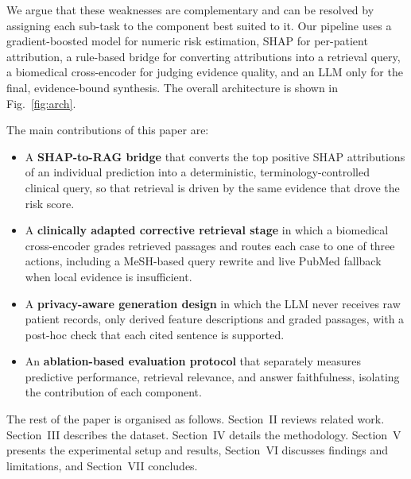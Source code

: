 \documentclass[conference]{IEEEtran}
\begin{document}
We argue that these weaknesses are complementary and can be resolved by
assigning each sub-task to the component best suited to it. Our pipeline
uses a gradient-boosted model for numeric risk estimation, SHAP for
per-patient attribution, a rule-based bridge for converting attributions
into a retrieval query, a biomedical cross-encoder for judging evidence
quality, and an LLM only for the final, evidence-bound synthesis. The
overall architecture is shown in Fig.~\ref{fig:arch}.

The main contributions of this paper are:
\begin{itemize}
\item A \textbf{SHAP-to-RAG bridge} that converts the top positive SHAP
attributions of an individual prediction into a deterministic,
terminology-controlled clinical query, so that retrieval is driven by the
same evidence that drove the risk score.
\item A \textbf{clinically adapted corrective retrieval stage} in which a
biomedical cross-encoder grades retrieved passages and routes each case to
one of three actions, including a MeSH-based query rewrite and live PubMed
fallback when local evidence is insufficient.
\item A \textbf{privacy-aware generation design} in which the LLM never
receives raw patient records, only derived feature descriptions and graded
passages, with a post-hoc check that each cited sentence is supported.
\item An \textbf{ablation-based evaluation protocol} that separately
measures predictive performance, retrieval relevance, and answer
faithfulness, isolating the contribution of each component.
\end{itemize}

The rest of the paper is organised as follows. Section~II reviews related
work. Section~III describes the dataset. Section~IV details the
methodology. Section~V presents the experimental setup and results,
Section~VI discusses findings and limitations, and Section~VII concludes.
\end{document}
